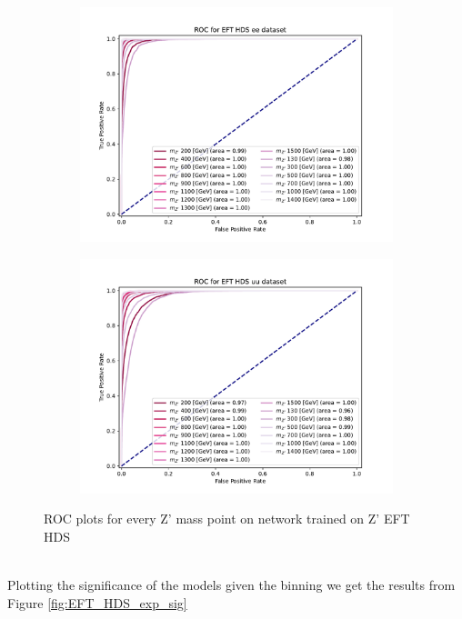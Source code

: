 \documentclass[12pt, a4paper]{book}
\begin{document}
\begin{figure}[!ht]
	\centering
	\begin{subfigure}[b]{0.49\textwidth}
      \centering
      \includegraphics[width=1\textwidth]{XGBoost/EFT_HDS/ROC_ee.pdf}
      \end{subfigure}
   \hfill
   \begin{subfigure}[b]{0.49\textwidth}
      \centering
      \includegraphics[width=1\textwidth]{XGBoost/EFT_HDS/ROC_uu.pdf}
      \end{subfigure}
   \caption{ROC plots for every Z' mass point on network trained on Z' EFT HDS}\label{fig:EFT_HDS_ROCS}
\end{figure}
\\Plotting the significance of the models given the binning we get the results from Figure \ref{fig:EFT_HDS_exp_sig}
\end{document}
